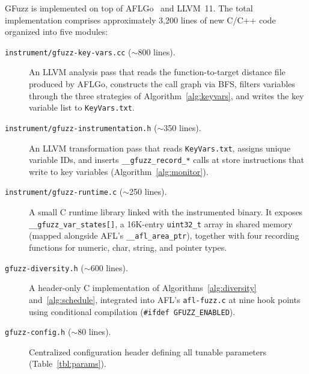 \documentclass[preprint,12pt,3p]{elsarticle}
\begin{document}
GFuzz is implemented on top of AFLGo~\cite{bohme2017directed} and LLVM~11.
The total implementation comprises approximately 3,200 lines of new C/C++
code organized into five modules:

\begin{description}
  \item[\texttt{instrument/gfuzz-key-vars.cc} ($\sim$800 lines).]
    An LLVM analysis pass that reads the function-to-target distance file
    produced by AFLGo, constructs the call graph via BFS, filters variables
    through the three strategies of Algorithm~\ref{alg:keyvars}, and writes
    the key variable list to \texttt{KeyVars.txt}.

  \item[\texttt{instrument/gfuzz-instrumentation.h} ($\sim$350 lines).]
    An LLVM transformation pass that reads \texttt{KeyVars.txt}, assigns
    unique variable IDs, and inserts \texttt{\_\_gfuzz\_record\_*} calls at
    store instructions that write to key variables
    (Algorithm~\ref{alg:monitor}).

  \item[\texttt{instrument/gfuzz-runtime.c} ($\sim$250 lines).]
    A small C runtime library linked with the instrumented binary.  It
    exposes \texttt{\_\_gfuzz\_var\_states[]}, a 16K-entry
    \texttt{uint32\_t} array in shared memory (mapped alongside AFL's
    \texttt{\_\_afl\_area\_ptr}), together with four recording functions for
    numeric, char, string, and pointer types.

  \item[\texttt{gfuzz-diversity.h} ($\sim$600 lines).]
    A header-only C implementation of Algorithms~\ref{alg:diversity}
    and~\ref{alg:schedule}, integrated into AFL's \texttt{afl-fuzz.c} at
    nine hook points using conditional compilation
    (\texttt{\#ifdef GFUZZ\_ENABLED}).

  \item[\texttt{gfuzz-config.h} ($\sim$80 lines).]
    Centralized configuration header defining all tunable parameters
    (Table~\ref{tbl:params}).
\end{description}
\end{document}
